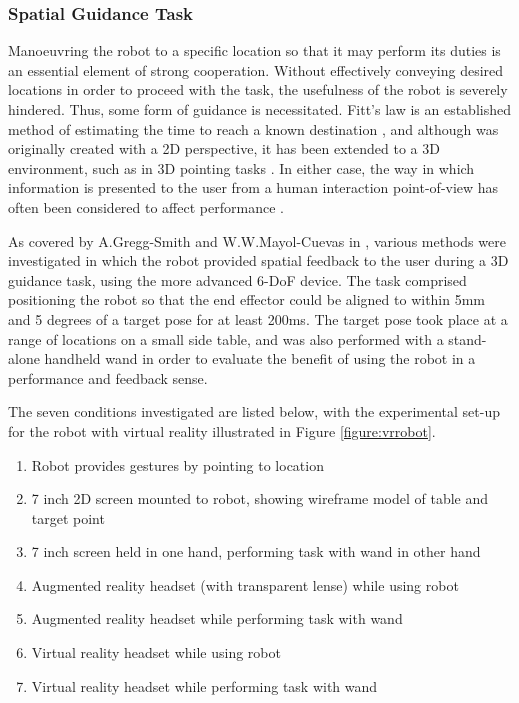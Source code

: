 \documentclass[11pt]{article}
\begin{document}
\subsubsection{Spatial Guidance Task}

Manoeuvring the robot to a specific location so that it may perform its duties is an essential element of strong cooperation. Without effectively conveying desired locations in order to proceed with the task, the usefulness of the robot is severely hindered. Thus, some form of guidance is necessitated. Fitt's law is an established method of estimating the time to reach a known destination \cite{fitts1954}, and although was originally created with a 2D perspective, it has been extended to a 3D environment, such as in 3D pointing tasks \cite{Cha2013}. In either case, the way in which information is presented to the user from a human interaction point-of-view has often been considered to affect performance \cite{soukoreff2004} \cite{MOTOYUKI1995}. 
  
As covered by A.Gregg-Smith and W.W.Mayol-Cuevas in \cite{GreggSmithFeedback}, various methods were investigated in which the robot provided spatial feedback to the user during a 3D guidance task, using the more advanced 6-DoF device. The task comprised positioning the robot so that the end effector could be aligned to within 5mm and 5 degrees of a target pose for at least 200ms. The target pose took place at a range of locations on a small side table, and was also performed with a stand-alone handheld wand in order to evaluate the benefit of using the robot in a performance and feedback sense.

The seven conditions investigated are listed below, with the experimental set-up for the robot with virtual reality illustrated in Figure \ref{figure:vrrobot}.
\begin{enumerate}
\item{Robot provides gestures by pointing to location}
\item{7 inch 2D screen mounted to robot, showing wireframe model of table and target point}
\item{7 inch screen held in one hand, performing task with wand in other hand}
\item{Augmented reality headset (with transparent lense) while using robot}
\item{Augmented reality headset while performing task with wand}
\item{Virtual reality headset while using robot}
\item{Virtual reality headset while performing task with wand}
\end{enumerate}
\end{document}
